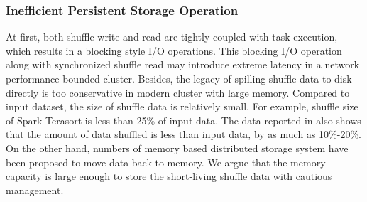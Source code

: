 \subsubsection{Inefficient Persistent Storage Operation}
At first, both shuffle write and read are tightly coupled with task execution, which results in a blocking style I/O operations. This blocking I/O operation along with synchronized shuffle read may introduce extreme latency in a network performance bounded cluster.
Besides, the legacy of spilling shuffle data to disk directly is too conservative in modern cluster with large memory. Compared to input dataset, the size of shuffle data is relatively small. For example, shuffle size of Spark Terasort \cite{spark-tera} is less than 25\% of input data. The data reported in \cite{makingsense} also shows that the amount of data shuffled is less than input data, by as much as 10\%-20\%. On the other hand, numbers of memory based distributed storage system have been proposed \cite{memcached, tachyon, ramcloud} to move data back to memory. 
We argue that the memory capacity is large enough to store the short-living shuffle data with cautious management.

